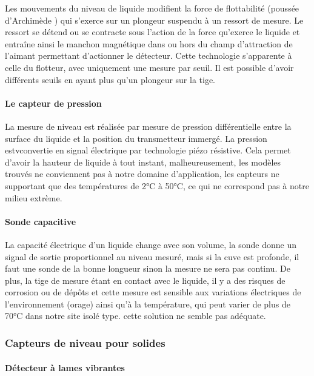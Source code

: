Les mouvements du niveau de liquide modifient la force de flottabilité (poussée d'Archimède ) qui s'exerce sur un plongeur suspendu à un ressort de mesure. Le ressort se détend ou se contracte sous l'action de la force qu'exerce le liquide et entraîne ainsi le manchon magnétique dans ou hors du champ d'attraction de l'aimant permettant d'actionner le détecteur. Cette technologie s'apparente à celle du flotteur, avec uniquement une mesure par seuil. Il est possible d'avoir différents seuils en ayant plus qu'un plongeur sur la tige.

\paragraph{Le capteur de pression}

La mesure de niveau est réalisée par mesure de pression différentielle entre la surface du liquide et la position du transmetteur immergé. La pression estvconvertie en signal électrique par technologie piézo résistive. Cela permet d'avoir la hauteur de liquide à tout instant, malheureusement, les modèles trouvés ne conviennent pas à notre domaine d'application, les capteurs ne supportant que des températures de 2°C à 50°C, ce qui ne correspond pas à notre milieu extrème.

\paragraph{Sonde capacitive}

La capacité électrique d'un liquide change avec son volume, la sonde donne un signal de sortie proportionnel au niveau mesuré, mais si la cuve est profonde, il faut une sonde de la bonne longueur sinon la mesure ne sera pas continu. De plus, la tige de mesure étant en contact avec le liquide, il y a des risques de corrosion ou de dépôts et cette mesure est sensible aux variations électriques de l'environnement (orage) ainsi qu'à la température, qui peut varier de plus de 70°C dans notre site isolé type. cette solution ne semble pas adéquate.

\subsubsection{Capteurs de niveau pour solides} 

\paragraph{Détecteur à lames vibrantes}


